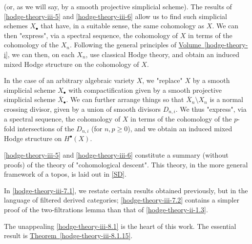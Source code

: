  (or, as we will say, by a smooth projective simplicial scheme).
  The results of \cref{hodge-theory-iii-5} and \cref{hodge-theory-iii-6} allow us to find such simplicial schemes \(X_\bullet \) that have, in a suitable sense, the same cohomology as \(X\).
  We can then "express", via a spectral sequence, the cohomology of \(X\) in terms of the cohomology of the \(X_n\).
  Following the general principles of \hyperref[hodge-theory-i]{Volume~\ref*{hodge-theory-i}}, we can then, on each \(X_n\), use classical Hodge theory, and obtain an induced mixed Hodge structure on the cohomology of \(X\).\par{}In the case of an arbitrary algebraic variety \(X\), we "replace" \(X\) by a smooth simplicial scheme \(X_\bullet \) with compactification given by a smooth projective simplicial scheme \(\overline {X}_\bullet \).
  We can further arrange things so that \(\overline {X}_n\setminus  X_n\) is a normal crossing divisor, given by a union of smooth divisors \(D_{n,i}\).
  We thus "express", via a spectral sequence, the cohomology of \(X\) in terms of the cohomology of the \(p\)-fold intersections of the \(D_{n,i}\) (for \(n,p\geqslant 0\)), and we obtain an induced mixed Hodge structure on \(H^\bullet (X)\).\par{}\cref{hodge-theory-iii-5} and \cref{hodge-theory-iii-6} constitute a summary (without proofs) of the theory of "cohomological descent".
  This theory, in the more general framework of a topos, is laid out in \hyperref[SD]{[SD]}.\par{}In \cref{hodge-theory-iii-7.1}, we restate certain results obtained previously, but in the language of filtered derived categories;
  \cref{hodge-theory-iii-7.2} contains a simpler proof of the two-filtrations lemma than that of \cref{hodge-theory-ii-1.3}.\par{}The unappealing \cref{hodge-theory-iii-8.1} is the heart of this work.
  The essential result is \hyperref[hodge-theory-iii-8.1.15]{Theorem~\ref*{hodge-theory-iii-8.1.15}}.
  
